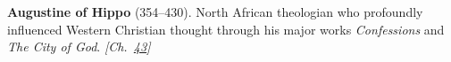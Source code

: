 \textbf{Augustine of Hippo} (354–430). North African theologian who profoundly influenced Western Christian thought through his major works \emph{Confessions} and \emph{The City of God}. \emph{[Ch.~\hyperref[ch:nearflatuniverse]{43}]}

